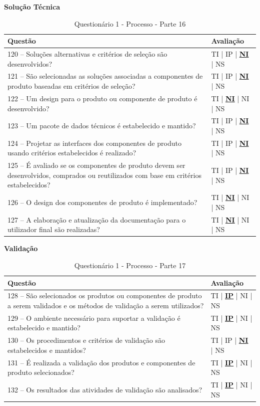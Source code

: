 \documentclass[openany,10pt,a4paper]{article}
\begin{document}
\begin{appendix}
	\begin{table}[H]
	\textbf{Solução Técnica}
	\centering
		\caption{Questionário 1 - Processo - Parte 16}
		\begin{tabular}{|p{5in}p{1in}|}		
			\hline
			\textbf{Questão}  & \textbf{Avaliação}\\ 
			\hline
			120 – Soluções alternativas e critérios de seleção são desenvolvidos?
	 & TI | IP | \underline{\textbf{NI}} | NS \\
			\hline
			121 – São selecionadas as soluções associadas a componentes de produto baseadas em critérios 
	de seleção?
	 & TI | IP | \underline{\textbf{NI}} | NS \\
			\hline
			122 – Um design para o produto ou componente de produto é desenvolvido?
	 & TI | \underline{\textbf{NI}} | NI | NS \\
			\hline
			123 – Um pacote de dados técnicos é estabelecido e mantido?
	 & TI | IP | \underline{\textbf{NI}} | NS \\
			\hline
			124 – Projetar as interfaces dos componentes de produto usando critérios estabelecidos é 
	realizado? 
	  & TI | IP | \underline{\textbf{NI}} | NS \\
			\hline
			125 – É avaliado se os componentes de produto devem ser desenvolvidos, comprados ou 
	reutilizados com base em critérios estabelecidos? 
	 & TI | IP | \underline{\textbf{NI}} | NS \\
	 \hline
			126 – O design dos componentes de produto é implementado?
	 & TI | \underline{\textbf{NI}} | NI | NS \\
			\hline
			127 – A elaboração e atualização da documentação para o utilizador final são realizadas?
	 & TI | \underline{\textbf{NI}} | NI | NS \\
			\hline
		\end{tabular} 
	\end{table}
	
	\begin{table}[H]
	\textbf{Validação}
		\centering
		\caption{Questionário 1 - Processo - Parte 17}
		\begin{tabular}{|p{5in}p{1in}|}		
			\hline
			\textbf{Questão}  & \textbf{Avaliação}\\ 
			\hline
			128 – São selecionados os produtos ou componentes de produto a serem validados e os 
	métodos de validação a serem utilizados?
	 & TI | \underline{\textbf{IP}} | NI | NS \\
			\hline
			129 – O ambiente necessário para suportar a validação é estabelecido e mantido?
	 & TI | \underline{\textbf{IP}} | NI | NS \\
			\hline
			130 – Os procedimentos e critérios de validação são estabelecidos e mantidos?
	 & TI | IP | \underline{\textbf{NI}} | NS \\
			\hline
			131 – É realizada a validação dos produtos e componentes de produto selecionados?
	 & TI | \underline{\textbf{IP}} | NI | NS \\
			\hline
			132 – Os resultados das atividades de validação são analisados?
	  & TI | \underline{\textbf{IP}} | NI | NS \\
			\hline
		\end{tabular} 
	\end{table}
	

\end{appendix}
\end{document}
